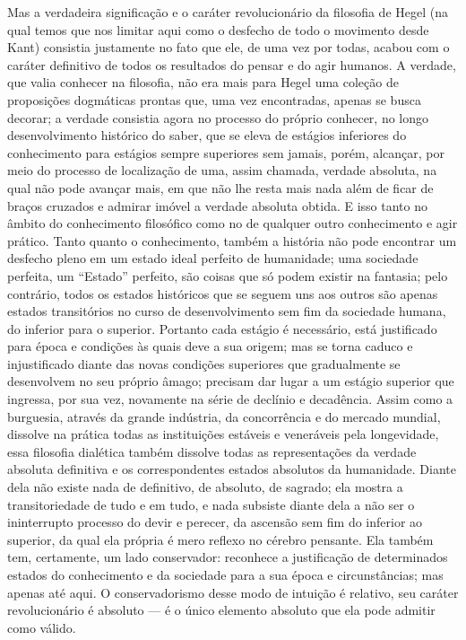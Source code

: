 Mas a verdadeira significação e o caráter revolucionário da filosofia
de Hegel (na
qual temos que nos limitar aqui como o desfecho de todo o movimento
desde Kant)
consistia justamente no fato que ele, de uma vez por todas, acabou com o
caráter definitivo de todos os resultados do pensar e do agir humanos. A
verdade, que valia conhecer na filosofia, não era mais
para Hegel uma
coleção de proposições dogmáticas prontas que, uma vez encontradas,
apenas se busca decorar; a verdade consistia agora no processo do %
próprio conhecer, no longo desenvolvimento histórico do saber,
que se eleva de estágios inferiores do 
conhecimento para estágios sempre superiores sem jamais, porém,
alcançar, por meio do processo de localização de uma, assim chamada, %
verdade absoluta, na qual não pode avançar mais, em que não lhe resta
mais nada além de ficar de braços cruzados e admirar imóvel a verdade
absoluta obtida. E isso tanto no âmbito do conhecimento filosófico como no
de qualquer outro conhecimento e agir prático. Tanto quanto o %
conhecimento, também a história não pode encontrar um desfecho pleno
em um estado ideal perfeito de 
humanidade; uma sociedade perfeita, um ``Estado'' perfeito, são coisas
que só podem existir na fantasia; pelo contrário, todos os estados
históricos que se seguem uns aos outros são apenas estados transitórios
no curso de desenvolvimento sem fim da sociedade humana, 
do inferior para o superior. Portanto cada estágio é necessário, está
justificado para época e condições às quais deve a sua origem; mas se %
torna caduco e injustificado diante das novas condições superiores que %
gradualmente se desenvolvem no seu próprio âmago; precisam dar lugar a
um estágio superior que ingressa, por sua vez, novamente na série de
declínio e decadência. Assim como a burguesia, através da grande
indústria, da concorrência e do mercado mundial, dissolve na prática
todas as instituições estáveis e veneráveis pela longevidade, essa
filosofia dialética também dissolve todas as representações da verdade
absoluta definitiva e os correspondentes estados absolutos da
humanidade. Diante dela não existe nada de definitivo, de absoluto, de
sagrado; ela mostra a transitoriedade de tudo e em tudo, e nada subsiste
diante dela a não ser o ininterrupto processo do devir e perecer, da
ascensão sem fim do inferior ao superior, da qual ela própria é mero
reflexo no cérebro pensante. Ela também tem, certamente, um lado
conservador: reconhece a justificação de determinados estados do
conhecimento e da sociedade para a sua época e circunstâncias; mas
apenas até aqui. O conservadorismo desse modo de intuição
é relativo, seu caráter revolucionário é 
absoluto --- é o único elemento absoluto que ela pode admitir como válido.\est\

